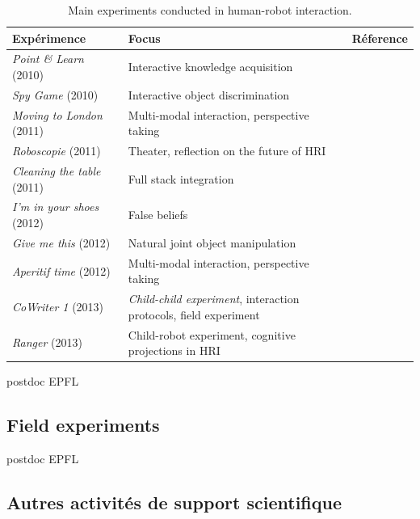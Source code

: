 \documentclass[a4paper]{article}
\begin{document}
\begin{table}
\begin{center}

\begin{tabular}{lll}
\bf{Expérimence} & Focus & Réference \\
\hline
{\it Point \& Learn} (2010) & Interactive knowledge acquisition & \cite{Lemaignan2010} \\
{\it Spy Game} (2010) & Interactive object discrimination & \cite{ros2010which} \\
{\it Moving to London} (2011) & Multi-modal interaction, perspective taking & \cite{lemaignan2011what} \\
{\it Roboscopie} (2011) & Theater, reflection on the future of HRI & \cite{lemaignan2012roboscopie} \\
{\it Cleaning the table} (2011) & Full stack integration & \cite{alami2011when} \\
{\it I'm in your shoes} (2012) & False beliefs & \cite{Warnier2012a} \\
{\it Give me this} (2012) & Natural joint object manipulation & \cite{gharbi2013natural} \\
{\it Aperitif time} (2012) & Multi-modal interaction, perspective taking & \cite{lemaignan2013talking} \\
{\it CoWriter 1} (2013) & \emph{Child-child experiment}, interaction protocols, field experiment &  \\
{\it Ranger} (2013) & Child-robot experiment, cognitive projections in HRI &  \\
\hline

\end{tabular}
\end{center}
\caption{Main experiments conducted in human-robot interaction.}
\label{experiences}
\end{table}

postdoc EPFL

\cite{fink2014which}

\subsection{Field experiments%
  \label{field-experiments}%
}


postdoc EPFL



\subsection{Autres activités de support scientifique}
\end{document}
